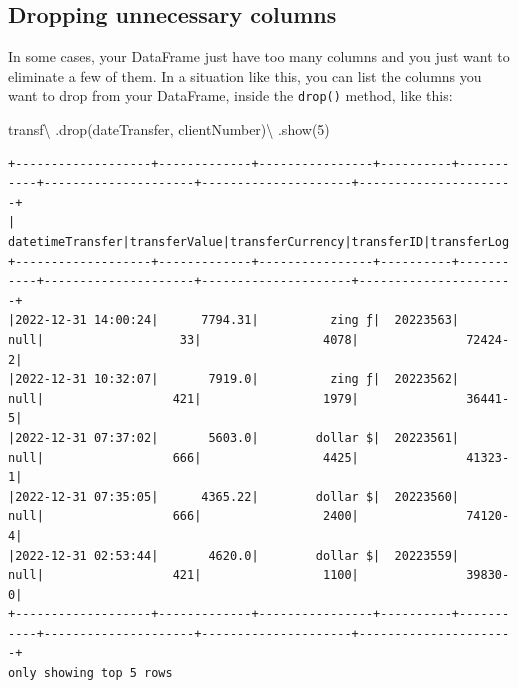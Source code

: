 \documentclass[
  11pt,
  letterpaper,
  DIV=11,
  numbers=noendperiod]{scrreprt}
\newenvironment{Shaded}{\begin{snugshade}}{\end{snugshade}}
\newcommand{\DecValTok}[1]{\textcolor[rgb]{0.68,0.00,0.00}{#1}}
\newcommand{\NormalTok}[1]{\textcolor[rgb]{0.00,0.23,0.31}{#1}}
\newcommand{\OperatorTok}[1]{\textcolor[rgb]{0.37,0.37,0.37}{#1}}
\newcommand{\StringTok}[1]{\textcolor[rgb]{0.13,0.47,0.30}{#1}}
\begin{document}
\hypertarget{dropping-unnecessary-columns}{%
\subsection{Dropping unnecessary
columns}\label{dropping-unnecessary-columns}}

In some cases, your DataFrame just have too many columns and you just
want to eliminate a few of them. In a situation like this, you can list
the columns you want to drop from your DataFrame, inside the
\texttt{drop()} method, like this:

\begin{Shaded}
\begin{Highlighting}[]
\NormalTok{transf}\OperatorTok{\textbackslash{}}
\NormalTok{  .drop(}\StringTok{\textquotesingle{}dateTransfer\textquotesingle{}}\NormalTok{, }\StringTok{\textquotesingle{}clientNumber\textquotesingle{}}\NormalTok{)}\OperatorTok{\textbackslash{}}
\NormalTok{  .show(}\DecValTok{5}\NormalTok{)}
\end{Highlighting}
\end{Shaded}

\begin{verbatim}
+-------------------+-------------+----------------+----------+-----------+---------------------+---------------------+----------------------+
|   datetimeTransfer|transferValue|transferCurrency|transferID|transferLog|destinationBankNumber|destinationBankBranch|destinationBankAccount|
+-------------------+-------------+----------------+----------+-----------+---------------------+---------------------+----------------------+
|2022-12-31 14:00:24|      7794.31|          zing ƒ|  20223563|       null|                   33|                 4078|               72424-2|
|2022-12-31 10:32:07|       7919.0|          zing ƒ|  20223562|       null|                  421|                 1979|               36441-5|
|2022-12-31 07:37:02|       5603.0|        dollar $|  20223561|       null|                  666|                 4425|               41323-1|
|2022-12-31 07:35:05|      4365.22|        dollar $|  20223560|       null|                  666|                 2400|               74120-4|
|2022-12-31 02:53:44|       4620.0|        dollar $|  20223559|       null|                  421|                 1100|               39830-0|
+-------------------+-------------+----------------+----------+-----------+---------------------+---------------------+----------------------+
only showing top 5 rows
\end{verbatim}
\end{document}
